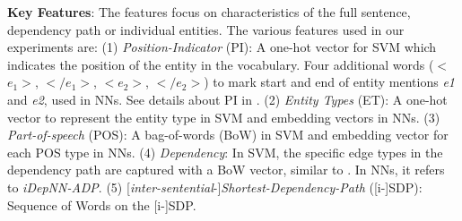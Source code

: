 \documentclass[letterpaper]{article} \usepackage{aaai19}  \usepackage{times}  \usepackage{helvet}  \usepackage{courier}  \usepackage{url}  \usepackage{graphicx}
\begin{document}
{\bf Key Features}: 
The features focus on characteristics of the full sentence, dependency path or individual entities. 
The various features used in our experiments are: 
{(1)} {\it Position-Indicator} (PI): A one-hot vector for SVM which indicates the position of the entity in the vocabulary. Four additional words ($<$$e_1$$>$, $<$$/e_1$$>$, $<$$e_2$$>$, $<$$/e_2$$>$)  
to mark start and end  of entity mentions \emph{e1} and \emph{e2},  used in NNs. See details about PI in \citeauthor{Gupta:Thesis:2015} . 
{(2)} {\it Entity Types} (ET): A one-hot vector to represent the entity type in SVM and embedding vectors in NNs.  
{(3)} {\it Part-of-speech} (POS):  A bag-of-words (BoW) in SVM and embedding vector  for each POS type in NNs.  
{(4)} {\it Dependency}:  In SVM, the specific edge types in the dependency path are captured with a BoW vector, similar to \citeauthor{grouin2016identification}  . 
In NNs, it refers to {\it iDepNN-ADP}. 
{(5)} [{\it inter-sentential}-]{\it Shortest-Dependency-Path} ([i-]SDP): Sequence of Words on the [i-]SDP.

\begin{table}[t]
\centering
\def\arraystretch{1.1}
\caption{Count of intra- and inter-sentential relationships in datasets (train+dev) from two domains}
\label{Intra-sentence and Inter-sentence relationships statistics in different datasets in medical and News article domains.}
\end{table}
\end{document}
